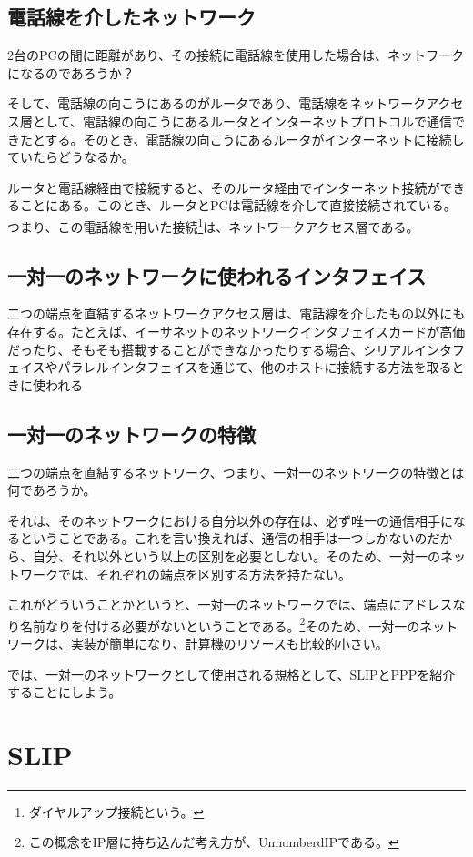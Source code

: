 \subsection{電話線を介したネットワーク}
2台のPCの間に距離があり、その接続に電話線を使用した場合は、ネットワークになるのであろうか？

そして、電話線の向こうにあるのがルータであり、電話線をネットワークアクセス層として、電話線の向こうにあるルータとインターネットプロトコルで通信できたとする。そのとき、電話線の向こうにあるルータがインターネットに接続していたらどうなるか。

ルータと電話線経由で接続すると、そのルータ経由でインターネット接続ができることにある。このとき、ルータとPCは電話線を介して直接接続されている。つまり、この電話線を用いた接続\footnote{ダイヤルアップ接続という。}は、ネットワークアクセス層である。

\subsection{一対一のネットワークに使われるインタフェイス}
二つの端点を直結するネットワークアクセス層は、電話線を介したもの以外にも存在する。たとえば、イーサネットのネットワークインタフェイスカードが高価だったり、そもそも搭載することができなかったりする場合、シリアルインタフェイスやパラレルインタフェイスを通じて、他のホストに接続する方法を取るときに使われる


\subsection{一対一のネットワークの特徴}
二つの端点を直結するネットワーク、つまり、一対一のネットワークの特徴とは何であろうか。

それは、そのネットワークにおける自分以外の存在は、必ず唯一の通信相手になるということである。これを言い換えれば、通信の相手は一つしかないのだから、自分、それ以外という以上の区別を必要としない。そのため、一対一のネットワークでは、それぞれの端点を区別する方法を持たない。

これがどういうことかというと、一対一のネットワークでは、端点にアドレスなり名前なりを付ける必要がないということである。\footnote{この概念をIP層に持ち込んだ考え方が、UnnumberdIPである。}そのため、一対一のネットワークは、実装が簡単になり、計算機のリソースも比較的小さい。

では、一対一のネットワークとして使用される規格として、SLIPとPPPを紹介することにしよう。

\section{SLIP}

